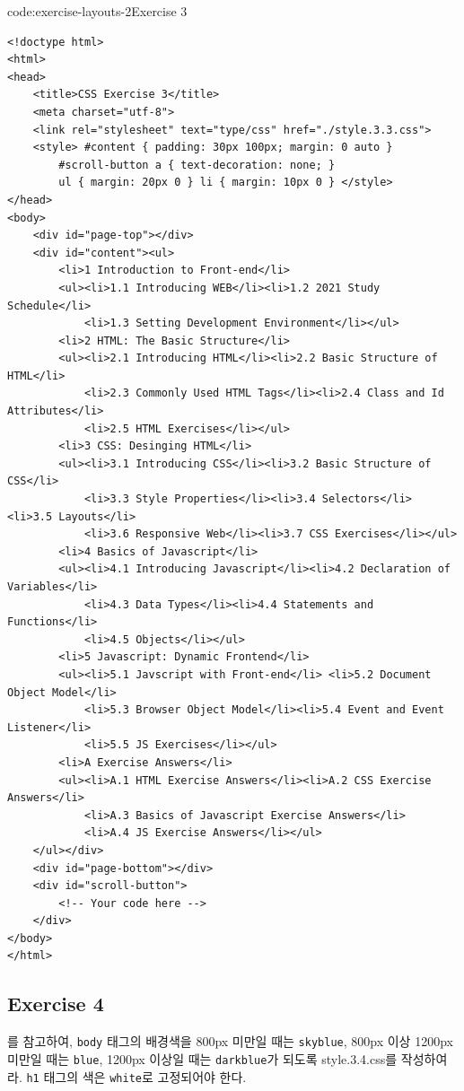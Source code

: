\begin{codeenv}{code:exercise-layouts-2}{Exercise 3}\begin{verbatim}
<!doctype html>
<html>
<head>
    <title>CSS Exercise 3</title>
    <meta charset="utf-8">
    <link rel="stylesheet" text="type/css" href="./style.3.3.css">
    <style> #content { padding: 30px 100px; margin: 0 auto }
        #scroll-button a { text-decoration: none; }
        ul { margin: 20px 0 } li { margin: 10px 0 } </style>
</head>
<body>
    <div id="page-top"></div>
    <div id="content"><ul>
        <li>1 Introduction to Front-end</li>
        <ul><li>1.1 Introducing WEB</li><li>1.2 2021 Study Schedule</li>
            <li>1.3 Setting Development Environment</li></ul>
        <li>2 HTML: The Basic Structure</li>
        <ul><li>2.1 Introducing HTML</li><li>2.2 Basic Structure of HTML</li>
            <li>2.3 Commonly Used HTML Tags</li><li>2.4 Class and Id Attributes</li>
            <li>2.5 HTML Exercises</li></ul>
        <li>3 CSS: Desinging HTML</li>
        <ul><li>3.1 Introducing CSS</li><li>3.2 Basic Structure of CSS</li>
            <li>3.3 Style Properties</li><li>3.4 Selectors</li> <li>3.5 Layouts</li>
            <li>3.6 Responsive Web</li><li>3.7 CSS Exercises</li></ul>
        <li>4 Basics of Javascript</li>
        <ul><li>4.1 Introducing Javascript</li><li>4.2 Declaration of Variables</li>
            <li>4.3 Data Types</li><li>4.4 Statements and Functions</li>
            <li>4.5 Objects</li></ul>
        <li>5 Javascript: Dynamic Frontend</li>
        <ul><li>5.1 Javscript with Front-end</li> <li>5.2 Document Object Model</li>
            <li>5.3 Browser Object Model</li><li>5.4 Event and Event Listener</li>
            <li>5.5 JS Exercises</li></ul>
        <li>A Exercise Answers</li>
        <ul><li>A.1 HTML Exercise Answers</li><li>A.2 CSS Exercise Answers</li>
            <li>A.3 Basics of Javascript Exercise Answers</li>
            <li>A.4 JS Exercise Answers</li></ul>
    </ul></div>
    <div id="page-bottom"></div>
    <div id="scroll-button">
        <!-- Your code here -->
    </div>
</body>
</html>    
\end{verbatim}
\end{codeenv}

\subsection*{Exercise 4}
를 참고하여, \texttt{body} 태그의 배경색을 800px 미만일 때는 \texttt{skyblue}, 800px 이상 1200px 미만일 때는 \texttt{blue}, 1200px 이상일 때는 \texttt{darkblue}가 되도록 style.3.4.css를 작성하여라. \texttt{h1} 태그의 색은 \texttt{white}로 고정되어야 한다.

